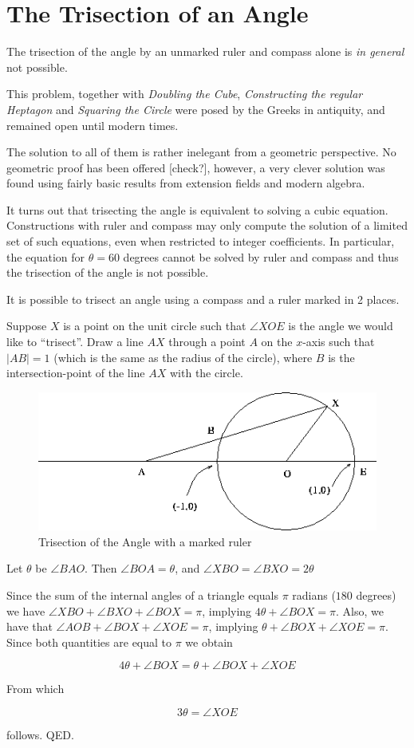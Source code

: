 \section{The Trisection of an Angle}

\begin{teo}
The trisection of the angle by an unmarked ruler and compass alone
is {\em in general} not possible.
\end{teo}


This problem, together with {\em Doubling the Cube}, {\em Constructing the
regular Heptagon} and {\em Squaring the Circle} were posed by the Greeks in
antiquity, and remained open until modern times.

The solution to all of them is rather inelegant from a geometric
perspective. No geometric proof has been offered [check?],
however, a very clever solution was found using fairly basic
results from extension fields and modern algebra.

It turns out that trisecting the angle is equivalent to solving
a cubic equation. Constructions with ruler and compass may
only compute the solution of a limited set of such equations,
even when restricted to integer coefficients. In particular,
the equation for $\theta = 60$ degrees cannot be solved by
ruler and compass and thus the trisection of the angle is not
possible.

It is possible to trisect an angle using a compass and a ruler marked
in 2 places.

Suppose $X$ is a point on the unit circle such that $\angle XOE$ is
the angle we would like to ``trisect''. Draw a line $AX$ through a
point $A$ on the $x$-axis such that $|AB| = 1$ (which is the same as
the radius of the circle), where $B$ is the intersection-point of the
line $AX$ with the circle.

\begin{figure}
\center
\includegraphics{figs/tri}
\caption{Trisection of the Angle with a marked ruler}
\end{figure}


Let $\theta$ be $\angle BAO$.
Then $\angle BOA = \theta$, and $\angle XBO = \angle BXO= 2\theta$

Since the sum of the internal angles of a triangle equals $\pi$
radians ($180$ degrees) we have $ \angle XBO + \angle BXO + \angle BOX
= \pi$, implying $4 \theta + \angle BOX = \pi$.  Also, we have that
$\angle AOB + \angle BOX + \angle XOE = \pi$, implying $\theta +\angle
BOX + \angle XOE = \pi$. Since both quantities are equal to $\pi$
we obtain

\[ 4 \theta + \angle BOX = \theta +\angle BOX + \angle XOE \]

From which

\[ 3 \theta = \angle XOE \]

follows. QED.
